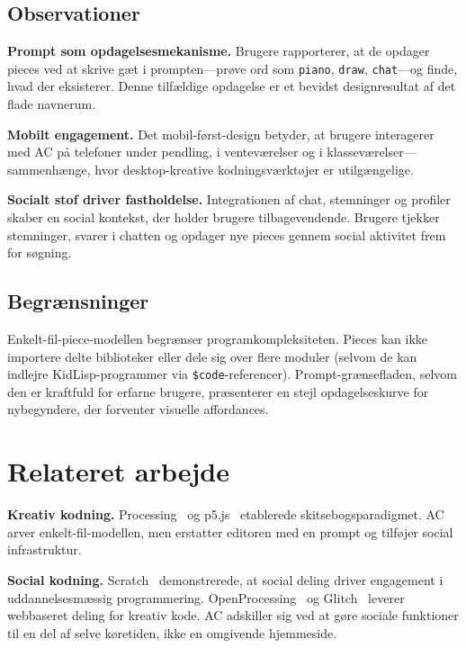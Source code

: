 \documentclass[10pt,letterpaper,twocolumn]{article}
\begin{document}
\subsection{Observationer}

\textbf{Prompt som opdagelsesmekanisme.} Brugere rapporterer, at de opdager pieces ved at skrive gæt i prompten---prøve ord som \texttt{piano}, \texttt{draw}, \texttt{chat}---og finde, hvad der eksisterer. Denne tilfældige opdagelse er et bevidst designresultat af det flade navnerum.

\textbf{Mobilt engagement.} Det mobil-først-design betyder, at brugere interagerer med AC på telefoner under pendling, i venteværelser og i klasseværelser---sammenhænge, hvor desktop-kreative kodningsværktøjer er utilgængelige.

\textbf{Socialt stof driver fastholdelse.} Integrationen af chat, stemninger og profiler skaber en social kontekst, der holder brugere tilbagevendende. Brugere tjekker stemninger, svarer i chatten og opdager nye pieces gennem social aktivitet frem for søgning.

\subsection{Begrænsninger}

Enkelt-fil-piece-modellen begrænser programkompleksiteten. Pieces kan ikke importere delte biblioteker eller dele sig over flere moduler (selvom de kan indlejre KidLisp-programmer via \texttt{\$code}-referencer). Prompt-grænsefladen, selvom den er kraftfuld for erfarne brugere, præsenterer en stejl opdagelseskurve for nybegyndere, der forventer visuelle affordances.


\section{Relateret arbejde}

\textbf{Kreativ kodning.} Processing~\citep{reas2007processing} og p5.js~\citep{mccarthy2015p5js} etablerede skitsebogsparadigmet. AC arver enkelt-fil-modellen, men erstatter editoren med en prompt og tilføjer social infrastruktur.

\textbf{Social kodning.} Scratch~\citep{resnick2009scratch} demonstrerede, at social deling driver engagement i uddannelsesmæssig programmering. OpenProcessing~\citep{openprocessing2009} og Glitch~\citep{glitch2017} leverer webbaseret deling for kreativ kode. AC adskiller sig ved at gøre sociale funktioner til en del af selve køretiden, ikke en omgivende hjemmeside.
\end{document}
